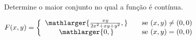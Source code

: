 
Determine o maior conjunto no qual a função é contínua.

$ F(x,y)=\left\{ 
				\begin{array}{cc}
					\mathlarger{\frac{xy}{2x^2+xy+y^2},} & \quad \textnormal{se } (x,y)\neq(0,0)\\
					\mathlarger{0,} & \quad \textnormal{se } (x,y) = (0,0)\\
				\end{array}
				\right.$
